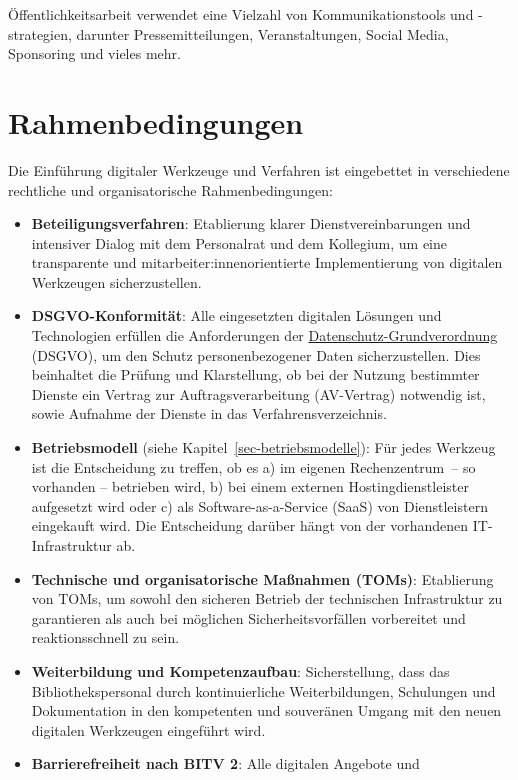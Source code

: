 \documentclass[
  11pt,
  letterpaper,
  DIV=11,
  twoside]{scrreprt}
\begin{document}
Öffentlichkeitsarbeit verwendet eine Vielzahl von Kommunikationstools
und -strategien, darunter Pressemitteilungen, Veranstaltungen, Social
Media, Sponsoring und vieles mehr.

\section{Rahmenbedingungen}\label{rahmenbedingungen}

Die Einführung digitaler Werkzeuge und Verfahren ist eingebettet in
verschiedene rechtliche und organisatorische Rahmenbedingungen:

\begin{itemize}
\item
  \textbf{Beteiligungsverfahren}: Etablierung klarer
  Dienstvereinbarungen und intensiver Dialog mit dem Personalrat und dem
  Kollegium, um eine transparente und mitarbeiter:innenorientierte
  Implementierung von digitalen Werkzeugen sicherzustellen.
\item
  \textbf{DSGVO-Konformität}: Alle eingesetzten digitalen Lösungen und
  Technologien erfüllen die Anforderungen der
  \hyperref[datenschutz]{Datenschutz-Grundverordnung} (DSGVO), um den
  Schutz personenbezogener Daten sicherzustellen. Dies beinhaltet die
  Prüfung und Klarstellung, ob bei der Nutzung bestimmter Dienste ein
  Vertrag zur Auftragsverarbeitung (AV-Vertrag) notwendig ist, sowie
  Aufnahme der Dienste in das Verfahrensverzeichnis.
\item
  \textbf{Betriebsmodell} (siehe Kapitel~\ref{sec-betriebsmodelle}): Für
  jedes Werkzeug ist die Entscheidung zu treffen, ob es a) im eigenen
  Rechenzentrum~-- so vorhanden -- betrieben wird, b) bei einem externen
  Hostingdienstleister aufgesetzt wird oder c) als Software-as-a-Service
  (SaaS) von Dienstleistern eingekauft wird. Die Entscheidung darüber
  hängt von der vorhandenen IT-Infrastruktur ab.
\item
  \textbf{Technische und organisatorische Maßnahmen (TOMs)}: Etablierung
  von TOMs, um sowohl den sicheren Betrieb der technischen Infrastruktur
  zu garantieren als auch bei möglichen Sicherheitsvorfällen vorbereitet
  und reaktionsschnell zu sein.
\item
  \textbf{Weiterbildung und Kompetenzaufbau}: Sicherstellung, dass das
  Bibliothekspersonal durch kontinuierliche Weiterbildungen, Schulungen
  und Dokumentation in den kompetenten und souveränen Umgang mit den
  neuen digitalen Werkzeugen eingeführt wird.
\item
  \textbf{Barrierefreiheit nach BITV 2}: Alle digitalen Angebote und

\end{itemize}
\end{document}
